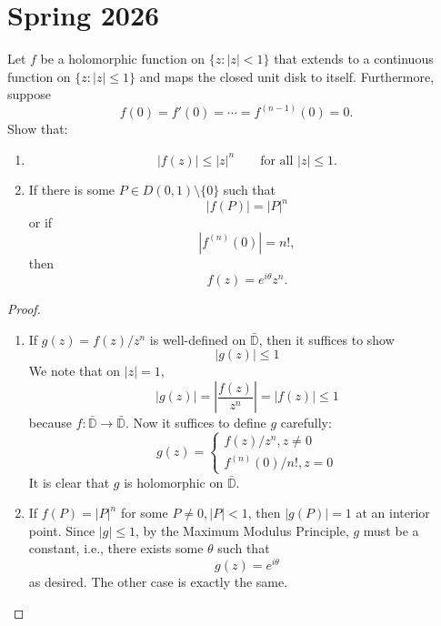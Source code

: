 \documentclass[openany]{book}
\newcommand{\D}{\mathbb{D}}
\begin{document}
\chapter{Spring 2026}
\begin{prob}
Let $f$ be a holomorphic function on $\{z:|z|<1\}$ that extends to a continuous
function on $\{z:|z|\leq 1\}$ and maps the closed unit disk to itself.
Furthermore, suppose
\[
f(0)=f'(0)=\cdots=f^{(n-1)}(0)=0.
\]
Show that:
\begin{enumerate}
    \item[(1)]
    \[
    |f(z)|\leq |z|^n \qquad \text{for all } |z|\leq 1.
    \]

    \item[(2)] If there is some $P\in D(0,1)\setminus\{0\}$ such that
    \[
    |f(P)|=|P|^n
    \]
    or if
    \[
    |f^{(n)}(0)|=n!,
    \]
    then
    \[
    f(z)=e^{i\theta}z^n.
    \]
\end{enumerate}
\end{prob}
\begin{proof}
    \begin{enumerate}
        \item[(1)] If $g(z)=f(z)/z^n$ is well-defined on $\bar{\D}$, then it suffices to show 
        \begin{equation*}
            |g(z)|\leq 1
        \end{equation*}
        We note that on $|z|=1$,
        \begin{equation*}
            |g(z)|=\left|\frac{f(z)}{z^n}\right|=|f(z)|\leq 1
        \end{equation*}
        because $f:\bar{\D}\to\bar{\D}$. Now it suffices to define $g$ carefully:
        \begin{equation*}
            g(z)=\begin{cases}
                f(z)/z^n, z\neq 0\\
                f^{(n)}(0)/n!, z=0
            \end{cases}
        \end{equation*}
        It is clear that $g$ is holomorphic on $\bar{\D}$.
        \item[(2)] If $f(P)=|P|^n$ for some $P\neq 0, |P|<1$, then $|g(P)|=1$ at an interior point. Since $|g|\leq 1$, by the Maximum Modulus Principle, $g$ must be a constant, i.e., there exists some $\theta$ such that 
        \begin{equation*}
            g(z)=e^{i\theta}
        \end{equation*}
        as desired. The other case is exactly the same.
    \end{enumerate}
\end{proof}
\end{document}
